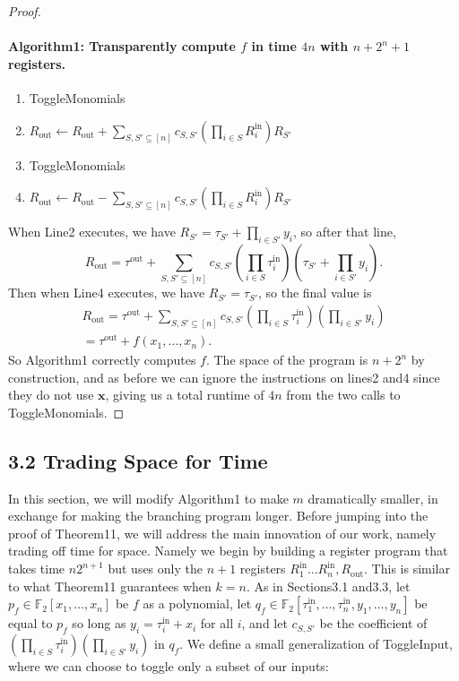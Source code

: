 \documentclass[10pt,a4paper]{article}
\begin{document}
\begin{proof}
\paragraph{Algorithm1: Transparently compute $f$ in time $4n$ with $n+2^n+1$ registers.}
\begin{enumerate}[label=\arabic*:]
\item ToggleMonomials
\item $R_{\mathrm{out}}\leftarrow R_{\mathrm{out}}+\sum_{S,S'\subseteq[n]}c_{S,S'}(\prod_{i\in S}R_i^{\mathrm{in}})R_{S'}$
\item ToggleMonomials
\item $R_{\mathrm{out}}\leftarrow R_{\mathrm{out}}-\sum_{S,S'\subseteq[n]}c_{S,S'}(\prod_{i\in S}R_i^{\mathrm{in}})R_{S'}$
\end{enumerate}
When Line2 executes, we have $R_{S'}=\tau_{S'}+\prod_{i\in S'}y_i$, so after that line,
\[R_{\mathrm{out}}=\tau^{\mathrm{out}}+\sum_{S,S'\subseteq[n]}c_{S,S'}\left(\prod_{i\in S}\tau_i^{\mathrm{in}}\right)\left(\tau_{S'}+\prod_{i\in S'}y_i\right).\]
Then when Line4 executes, we have $R_{S'}=\tau_{S'}$, so the final value is
\begin{multline*}
R_{\mathrm{out}}=\tau^{\mathrm{out}}+\sum_{S,S'\subseteq[n]}c_{S,S'}\left(\prod_{i\in S}\tau_i^{\mathrm{in}}\right)\left(\prod_{i\in S'}y_i\right)\\
=\tau^{\mathrm{out}}+f(x_1,\ldots,x_n).
\end{multline*}
So Algorithm1 correctly computes $f$. The space of the program is $n+2^n$ by construction, and as before we can ignore the instructions on lines2 and4 since they do not use $\mathbf x$, giving us a total runtime of $4n$ from the two calls to ToggleMonomials.
\end{proof}

\subsection*{3.2 Trading Space for Time}
In this section, we will modify Algorithm1 to make $m$ dramatically smaller, in exchange for making the branching program longer.
Before jumping into the proof of Theorem11, we will address the main innovation of our work, namely trading off time for space. Namely we begin by building a register program that takes time $n2^{n+1}$ but uses only the $n+1$ registers $R_1^{\mathrm{in}}\ldots R_n^{\mathrm{in}},R_{\mathrm{out}}$. This is similar to what Theorem11 guarantees when $k=n$.
As in Sections3.1 and3.3, let $p_f\in\mathbb F_2[x_1,\ldots,x_n]$ be $f$ as a polynomial, let $q_f\in\mathbb F_2[\tau_1^{\mathrm{in}},\ldots,\tau_n^{\mathrm{in}},y_1,\ldots,y_n]$ be equal to $p_f$ so long as $y_i=\tau_i^{\mathrm{in}}+x_i$ for all $i$, and let $c_{S,S'}$ be the coefficient of $(\prod_{i\in S}\tau_i^{\mathrm{in}})(\prod_{i\in S'}y_i)$ in $q_f$. We define a small generalization of ToggleInput, where we can choose to toggle only a subset of our inputs:
\end{document}
